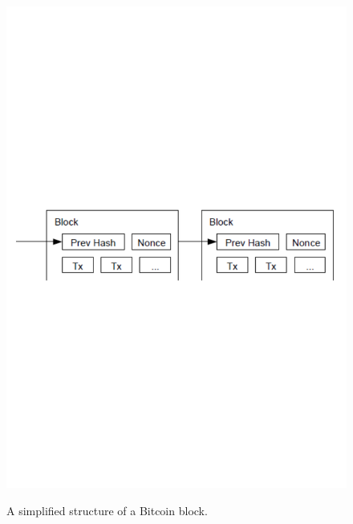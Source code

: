 \begin{figure}[h!]
  \centering
  \includegraphics[width = 15cm]{./figures/block-structure-simple.pdf}\\[0.5cm]
  \caption{A simplified structure of a Bitcoin block. \cite{RefWorks:doc:5c39e80ae4b0854ae611b047}}
  \label{fig:simplified-block-structure}
\end{figure}

